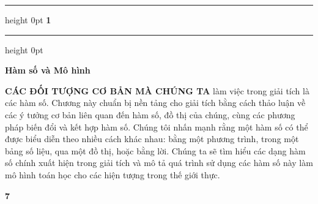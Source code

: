 \noindent
\begin{minipage}[t]{0.26\textwidth}
    \hrule height 0pt\relax
    \vspace*{0pt}%
    \raggedleft
    {\fontsize{90}{90}\selectfont\sffamily\bfseries\color{stewartcyan}1\hspace*{6pt}}\par
\end{minipage}%
\hfill
\begin{minipage}[t]{0.71\textwidth}
    \hrule height 0pt\relax
    \vspace*{0pt}%
    \noindent
    \smash{\color{stewartcyan}\rule[-12.0cm]{1.5pt}{12.8cm}}\hspace{0.45cm}%
    \parbox[t]{\dimexpr\linewidth-1.5pt-0.45cm\relax}{%
        \vspace*{0pt}%
        {\fontsize{32}{38}\selectfont\sffamily\bfseries Hàm số và Mô hình\par}%
        \vspace{1.0cm}%
        \noindent
        {\fontsize{10pt}{14.5pt}\selectfont
        \textbf{CÁC ĐỐI TƯỢNG CƠ BẢN MÀ CHÚNG TA} làm việc trong giải tích là các hàm số. Chương này chuẩn bị nền tảng cho giải tích bằng cách thảo luận về các ý tưởng cơ bản liên quan đến hàm số, đồ thị của chúng, cùng các phương pháp biến đổi và kết hợp hàm số. Chúng tôi nhấn mạnh rằng một hàm số có thể được biểu diễn theo nhiều cách khác nhau: bằng một phương trình, trong một bảng số liệu, qua một đồ thị, hoặc bằng lời. Chúng ta sẽ tìm hiểu các dạng hàm số chính xuất hiện trong giải tích và mô tả quá trình sử dụng các hàm số này làm mô hình toán học cho các hiện tượng trong thế giới thực.\par}%
    }%
\end{minipage}

\vfill
\noindent\hfill{\fontsize{11}{13}\selectfont\sffamily\bfseries 7}\par